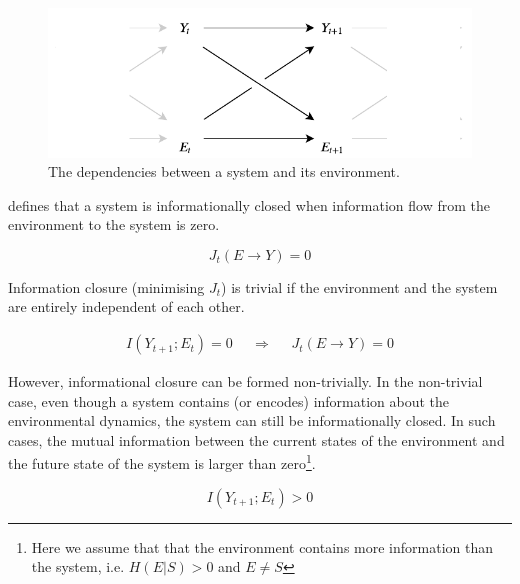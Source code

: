 \documentclass[utf8]{article}
\begin{document}
            
				\begin{figure}
					\includegraphics[width=\textwidth]{WritingMaterials/Fig_SystemAndEnv/SystemAndEnv_2.pdf}
					\caption{The dependencies between a system and its environment.} %
					\label{fig:SystemAndEnv}
				\end{figure}


			\noindent
			\cite{BERTSCHINGER.2006} defines that a system is informationally closed when information flow from the environment to the system is zero.

				\begin{equation}
				J_{t}(E \rightarrow Y )=0
				\end{equation}


			\noindent
			Information closure (minimising $J_t$) is trivial if the environment and the system are entirely independent of each other.

				\begin{equation}
				\begin{aligned}
				{I(Y_{t+1};E_{t})=0}&&{\Rightarrow}&&{J_{t}(E \rightarrow Y )=0}
				\end{aligned}
				\end{equation}


			\noindent
			However, informational closure can be formed non-trivially. In the non-trivial case, even though a system contains (or encodes) information about the environmental dynamics, the system can still be informationally closed. In such cases, the mutual information between the current states of the environment and the future state of the system is larger than zero\footnote{Here we assume that that the environment contains more information than the system, i.e. $H(E|S)>0$ and $E\neq S$}. 

				\begin{equation}
				I(Y_{t+1};E_{t}) > 0
				\end{equation}
\end{document}
